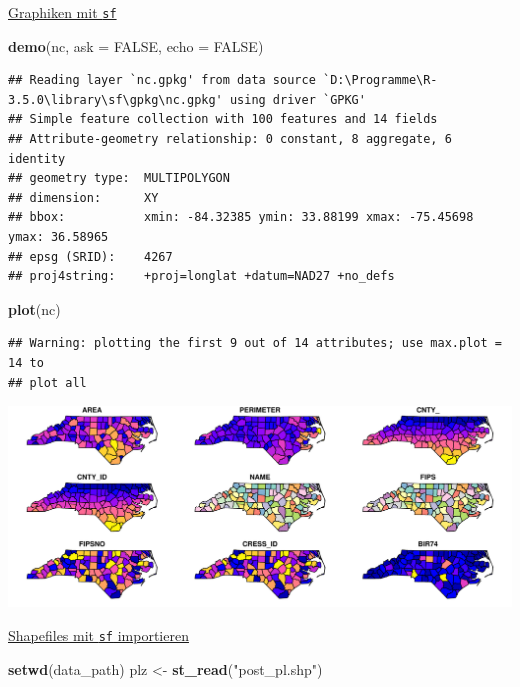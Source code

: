 \documentclass[ignorenonframetext,]{beamer}
\newenvironment{Shaded}{\begin{snugshade}}{\end{snugshade}}
\newcommand{\KeywordTok}[1]{\textcolor[rgb]{0.13,0.29,0.53}{\textbf{#1}}}
\newcommand{\DataTypeTok}[1]{\textcolor[rgb]{0.13,0.29,0.53}{#1}}
\newcommand{\StringTok}[1]{\textcolor[rgb]{0.31,0.60,0.02}{#1}}
\newcommand{\OtherTok}[1]{\textcolor[rgb]{0.56,0.35,0.01}{#1}}
\newcommand{\NormalTok}[1]{#1}
\begin{document}
\begin{frame}[fragile]{\href{https://r-spatial.github.io/sf/articles/sf5.html}{Graphiken
mit \texttt{sf}}}

\begin{Shaded}
\begin{Highlighting}[]
\KeywordTok{demo}\NormalTok{(nc, }\DataTypeTok{ask =} \OtherTok{FALSE}\NormalTok{, }\DataTypeTok{echo =} \OtherTok{FALSE}\NormalTok{)}
\end{Highlighting}
\end{Shaded}

\begin{verbatim}
## Reading layer `nc.gpkg' from data source `D:\Programme\R-3.5.0\library\sf\gpkg\nc.gpkg' using driver `GPKG'
## Simple feature collection with 100 features and 14 fields
## Attribute-geometry relationship: 0 constant, 8 aggregate, 6 identity
## geometry type:  MULTIPOLYGON
## dimension:      XY
## bbox:           xmin: -84.32385 ymin: 33.88199 xmax: -75.45698 ymax: 36.58965
## epsg (SRID):    4267
## proj4string:    +proj=longlat +datum=NAD27 +no_defs
\end{verbatim}

\begin{Shaded}
\begin{Highlighting}[]
\KeywordTok{plot}\NormalTok{(nc)}
\end{Highlighting}
\end{Shaded}

\begin{verbatim}
## Warning: plotting the first 9 out of 14 attributes; use max.plot = 14 to
## plot all
\end{verbatim}

\includegraphics{simplefeatures_files/figure-beamer/unnamed-chunk-12-1.pdf}

\end{frame}

\begin{frame}[fragile]{\href{https://cran.r-project.org/web/packages/sf/vignettes/sf2.html}{Shapefiles
mit \texttt{sf} importieren}}

\begin{Shaded}
\begin{Highlighting}[]
\KeywordTok{setwd}\NormalTok{(data_path)}
\NormalTok{plz <-}\StringTok{ }\KeywordTok{st_read}\NormalTok{(}\StringTok{"post_pl.shp"}\NormalTok{)}
\end{Highlighting}
\end{Shaded}

\end{frame}
\end{document}
